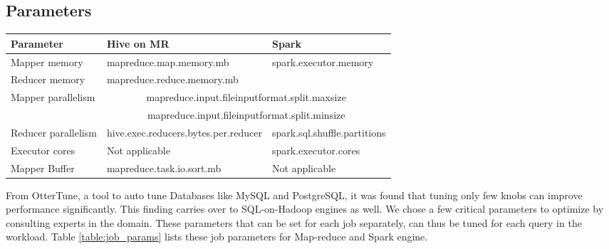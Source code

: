 \subsection{Parameters}


\begin{table*}
	\begin{tabular}{ |l|l|l| } 
		\hline
		Parameter & Hive on MR & Spark \\ 
		\hline
		Mapper memory & mapreduce.map.memory.mb & \multirow{2}{*}{spark.executor.memory} \\
		Reducer memory & mapreduce.reduce.memory.mb & \\
		\hline
		\multirow{2}{*}{Mapper parallelism} & \multicolumn{2}{|c|}{mapreduce.input.fileinputformat.split.maxsize} \\
		& \multicolumn{2}{|c|}{mapreduce.input.fileinputformat.split.minsize} \\
		\hline
		Reducer parallelism & hive.exec.reducers.bytes.per.reducer & spark.sql.shuffle.partitions \\
		\hline
		Executor cores & Not applicable & spark.executor.cores \\
		\hline
		Mapper Buffer & mapreduce.task.io.sort.mb & Not applicable \\
		\hline
	\end{tabular}
	\caption{Parameters of the Job to be optimized}
	\label{table:job_params}
\end{table*}


From OtterTune\cite{vanaken}, a tool to auto tune Databases like MySQL and PostgreSQL, it was found that tuning only few knobs can improve performance significantly. This finding carries over to SQL-on-Hadoop engines as well. We chose a few critical parameters to optimize by consulting experts in the domain. These parameters that can be set for each job separately, can thus be tuned for each query in the workload. Table \ref{table:job_params} lists these job parameters for Map-reduce and Spark engine.


